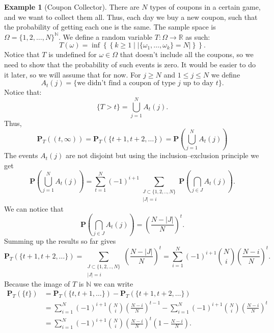 \documentclass[11pt,a4paper]{article}
\theoremstyle{definition}
\newtheorem{example}{Example}[section]
\theoremstyle{plain}
\newcommand{\N}{\mathbb{N}}
\newcommand{\R}{\mathbb{R}}
\newcommand{\set}[2]{ \left\{ #1 \mid #2 \right\} }
\newcommand{\abs}[1]{\left\lvert #1\right\rvert}
\begin{document}
  \begin{example}[Coupon Collector]
    There are $N$ types of coupons in a certain game, and we want to collect
    them all. 
    Thus, each day we buy a new coupon, such that the probability of getting
    each one is the same.
    The sample space is $\Omega = \{1,2,\dots,N\}^{\N}$.
    We define a random variable $T \colon \Omega \to \R$ as such:
    \[
      T(\omega) = 
      \inf\left\{\set{k \geq 1}{\abs{\{\omega_1,\dots,\omega_k\} = N}}\right\}.
    \]
    Notice that $T$ is undefined for $\omega \in \Omega$ that doesn't include
    all the coupons, so we need to show that the probability of such events
    is zero. It would be easier to do it later, so we will assume that for
    now. For $j \geq N$ and $1 \le j \le N$ we define
    \[
      A_t(j) = \{\text{we didn't find a coupon of type $j$ up to day $t$}\}.
    \]
    Notice that:
    \[
      \{T > t\} = \bigcup_{j=1}^{N} A_t(j).
    \]
    Thus,
    \[
      \mathbf P_T\left((t,\infty)\right) =
      \mathbf P_T\left(\{t + 1, t + 2, \dots\}\right) =
      \mathbf P\left(\bigcup_{j=1}^{N} A_t(j) \right)
    \]
    The events $A_t(j)$ are not disjoint but using the inclusion--exclusion
    principle we get
    \[
      \mathbf P\left(\bigcup_{j=1}^{N} A_t(j) \right) =
      \sum_{t=1}^{N}(-1)^{i+1} 
      \sum_{\substack{J\subset\{1,2,..,N\} \\ \abs{J} = i}}
      \mathbf{P}\left(\bigcap_{j\in J}A_{t}(j)\right).
    \]
    We can notice that
    \[
      \mathbf{P}\left(\bigcap_{j\in J}A_{t}(j)\right) = 
      \left(\frac{N - \abs{J}}{N}\right)^t.
    \]
    Summing up the results so far gives
    \[
      \mathbf P_T\left(\{t + 1, t + 2, \dots\}\right) =
      \sum_{\substack{J\subset\{1,2,..,N\} \\ \abs{J} = i}}
      \left(\frac{N - \abs{J}}{N}\right)^t =
      \sum_{i=1}^{N} (-1)^{i+1} \binom{N}{i} \left(\frac{N-i}{N}\right)^{t}.
    \]
    Because the image of $T$ is $\N$ we can write
    \begin{align*}
      \mathbf P_T\left(\{t\}\right) &=
      \mathbf P_T\left(\{t, t + 1, \dots\}\right) -
      \mathbf P_T\left(\{t + 1, t + 2, \dots\}\right) \\ &=
      \sum_{i=1}^{N}(-1)^{i+1}\binom{N}{i}\left(\frac{N-i}{N}\right)^{t-1} -
      \sum_{i=1}^{N}(-1)^{i+1}\binom{N}{i}\left(\frac{N-i}{N}\right)^{t} \\ &=
      \sum_{i=1}^{N}(-1)^{i+1}\binom{N}{i}\left(\frac{N-i}{N}\right)^{t}
      \left(1 - \frac{N-i}{N}\right).
    \end{align*}

\end{example}
\end{document}
